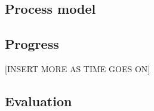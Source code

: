 \subsection{Process model}


\subsection{Progress}




[INSERT MORE AS TIME GOES ON]

\subsection{Evaluation}


